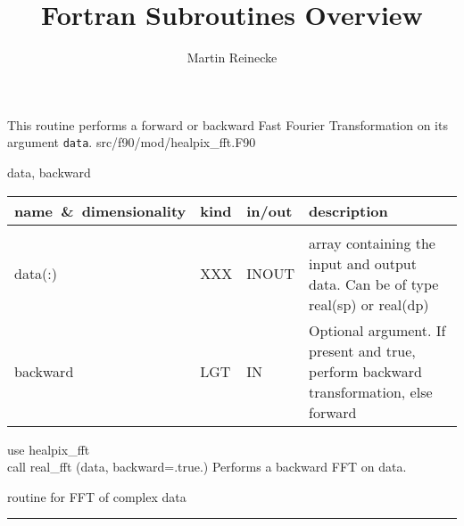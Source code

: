 \sloppy

\title{\healpix Fortran Subroutines Overview}
 \section[real\_fft]{ }
\label{sub:real_fft}
\author{Martin Reinecke}

\begin{facility}
{This routine performs a forward or backward Fast Fourier Transformation
on its argument {\tt data}.}
{src/f90/mod/healpix\_fft.F90}
\end{facility}

\begin{f90format}
{data, backward}
\end{f90format}

\begin{arguments}
{
\begin{tabular}{p{0.3\hsize} p{0.05\hsize} p{0.1\hsize} p{0.45\hsize}} \hline  
\textbf{name~\&~dimensionality} & \textbf{kind} & \textbf{in/out} & \textbf{description} \\ \hline
                   &   &   &                           \\ %
data(:) & XXX & INOUT &
  array containing the input and output data.
  Can be of type real(sp) or real(dp) \\
backward & LGT & IN & Optional argument. If present and true, perform backward transformation, else forward 
\end{tabular}}
\end{arguments}

\begin{example}
{
use healpix\_fft \\
call real\_fft (data, backward=.true.)
}
{
Performs a backward FFT on data.
}
\end{example}

\begin{related}
  \begin{sulist}{} %
  \item[\htmlref{complex\_fft}{sub:complex_fft}] routine for FFT of complex data
  \end{sulist}
\end{related}

\rule{\hsize}{2mm}

\newpage
